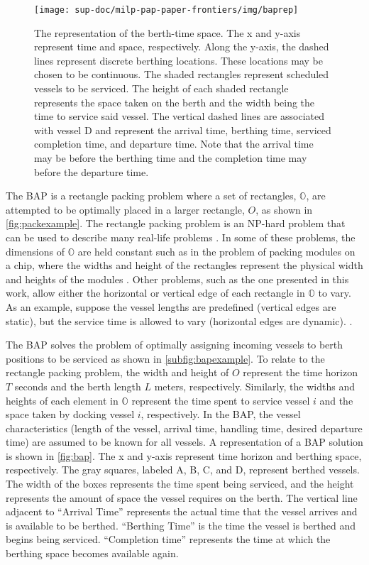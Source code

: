 \documentclass[ee,thesis]{usuthesis}
\begin{document}
\begin{figure}
  \centering
  \texttt{[image: sup-doc/milp-pap-paper-frontiers/img/baprep]}
  \caption{The representation of the berth-time space. The x and y-axis represent time and space, respectively. Along the y-axis, the dashed lines represent discrete berthing locations. These locations may be chosen to be continuous. The shaded rectangles represent scheduled vessels to be serviced. The height of each shaded rectangle represents the space taken on the berth and the width being the time to service said vessel. The vertical dashed lines are associated with vessel D and represent the arrival time, berthing time, serviced completion time, and departure time. Note that the arrival time may be before the berthing time and the completion time may before the departure time.}
  \label{fig:bap}
\end{figure}

The BAP is a rectangle packing problem where a set of rectangles, \(\mathbb{O}\), are attempted to be optimally placed in
a larger rectangle, \(O\), as shown in \autoref{fig:packexample}. The rectangle packing problem is an NP-hard problem that
can be used to describe many real-life problems \cite{bruin-2013-rectan-packin,murata-1995-rectan}. In some of these
problems, the dimensions of \(\mathbb{O}\) are held constant such as in the problem of packing modules on a chip, where
the widths and height of the rectangles represent the physical width and heights of the modules
\cite{murata-1995-rectan}. Other problems, such as the one presented in this work, allow either the horizontal or
vertical edge of each rectangle in \(\mathbb{O}\) to vary. As an example, suppose the vessel lengths are predefined
(vertical edges are static), but the service time is allowed to vary (horizontal edges are dynamic).
\cite{buhrkal-2011-model-discr}.

The BAP solves the problem of optimally assigning incoming vessels to berth positions to be serviced as shown in
\autoref{subfig:bapexample}. To relate to the rectangle packing problem, the width and height of \(O\) represent the time
horizon \(T\) seconds and the berth length \(L\) meters, respectively. Similarly, the widths and heights of each element in
\(\mathbb{O}\) represent the time spent to service vessel \(i\) and the space taken by docking vessel \(i\), respectively. In
the BAP, the vessel characteristics (length of the vessel, arrival time, handling time, desired departure time) are
assumed to be known for all vessels. A representation of a BAP solution is shown in \autoref{fig:bap}. The x and y-axis
represent time horizon and berthing space, respectively. The gray squares, labeled A, B, C, and D, represent berthed
vessels. The width of the boxes represents the time spent being serviced, and the height represents the amount of space
the vessel requires on the berth. The vertical line adjacent to ``Arrival Time'' represents the actual time that the
vessel arrives and is available to be berthed. ``Berthing Time'' is the time the vessel is berthed and begins being
serviced. ``Completion time'' represents the time at which the berthing space becomes available again.
\end{document}
